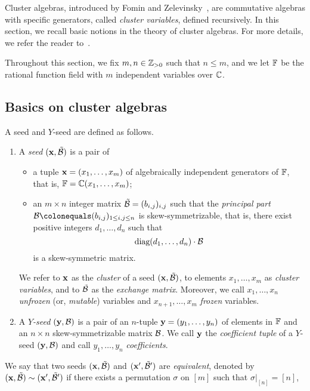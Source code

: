 Cluster algebras, introduced by Fomin and Zelevinsky~\cite{FZ1_2002}, are
commutative algebras with specific generators, called \emph{cluster
	variables}, defined recursively.
In this section, we recall basic notions in the theory of cluster algebras.
For more details, we refer the reader to~\cite{FZ1_2002, FZ2_2003, FZ4_2007}.

Throughout this section, we fix $m, n \in \mathbb{Z}_{>0}$ such that $n \leq m$, and
we let $\mathbb{F}$ be the rational function field with $m$ independent
variables over $\mathbb{C}$.


\subsection{Basics on cluster algebras}


\begin{definition}[{cf. \cite{FZ1_2002, FZ2_2003, FZ4_2007}}]\label{definition:seeds}
A seed and $Y$-seed are defined as follows.
\begin{enumerate}
\item	A \emph{seed} $(\mathbf{x}, \mathcal{\tilde{B}})$ is a pair of 
	\begin{itemize}
		\item a tuple $\mathbf{x} = (x_1,\dots,x_m)$ of algebraically
		independent generators of $\mathbb{F}$, that is, 
		$\mathbb{F} = \mathbb{C}(x_1,\dots,x_m)$;
		\item an $m \times n$ integer matrix $\mathcal{\tilde{B}} = (b_{i,j})_{i,j}$ such
		that the \emph{principal part} $\qbasispr \colonequals
		(b_{i,j})_{1\leq i,j\leq n}$ is skew-symmetrizable, that is, there
		exist positive integers $d_1,\dots,d_n$ such that
\[		
\textrm{diag}(d_1,\dots,d_n) \cdot \mathcal{B} 
\]
		is a
		skew-symmetric matrix.
	\end{itemize}
	We refer to $\mathbf{x}$ as the \emph{cluster} of a seed $(\mathbf{x}, \mathcal{\tilde{B}})$, to elements $x_1,\dots,x_m$ as \emph{cluster variables}, and to
	$\mathcal{\tilde{B}}$ as the \emph{exchange matrix}. Moreover, we call $x_1,\dots,x_n$
	\emph{unfrozen} (or, \emph{mutable}) variables and $x_{n+1},\dots,x_m$
	\emph{frozen} variables.
\item A \emph{$Y$-seed} $(\mathbf{y},\mathcal{B})$ is a pair of an $n$-tuple $\mathbf{y}=(y_1,\dots,y_n)$ of elements in $\mathbb{F}$ and an $n\times n$ skew-symmetrizable matrix $\mathcal{B}$. 
We call $\mathbf{y}$ the \emph{coefficient tuple} of a $Y$-seed $(\mathbf{y}, \mathcal{B})$ and call $y_1,\dots,y_n$ \emph{coefficients}.
\end{enumerate}
\end{definition}
We say that two seeds $(\mathbf{x}, \mathcal{\tilde{B}})$ and $(\mathbf{x}', \mathcal{\tilde{B}}')$ are \textit{equivalent}, denoted by $(\mathbf{x}, \mathcal{\tilde{B}})\sim(\mathbf{x}', \mathcal{\tilde{B}}')$ if there exists a permutation $\sigma$ on $[m]$ such that $\sigma|_{[n]}=[n]$, 
